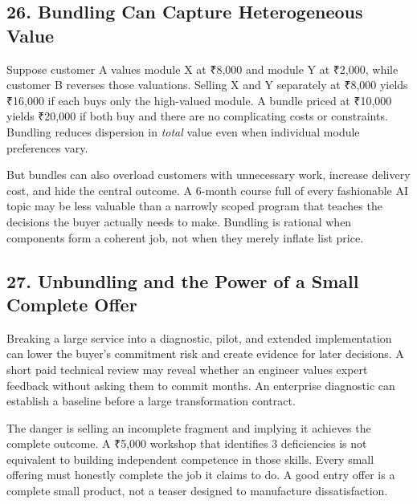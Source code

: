 \subsection*{26. Bundling Can Capture Heterogeneous Value}

Suppose customer A values module X at ₹8,000 and module Y at ₹2,000, while customer B reverses those valuations. Selling X and Y separately at ₹8,000 yields ₹16,000 if each buys only the high-valued module. A bundle priced at ₹10,000 yields ₹20,000 if both buy and there are no complicating costs or constraints. Bundling reduces dispersion in \emph{total} value even when individual module preferences vary.

But bundles can also overload customers with unnecessary work, increase delivery cost, and hide the central outcome. A 6-month course full of every fashionable AI topic may be less valuable than a narrowly scoped program that teaches the decisions the buyer actually needs to make. Bundling is rational when components form a coherent job, not when they merely inflate list price.

\subsection*{27. Unbundling and the Power of a Small Complete Offer}

Breaking a large service into a diagnostic, pilot, and extended implementation can lower the buyer's commitment risk and create evidence for later decisions. A short paid technical review may reveal whether an engineer values expert feedback without asking them to commit months. An enterprise diagnostic can establish a baseline before a large transformation contract.

The danger is selling an incomplete fragment and implying it achieves the complete outcome. A ₹5,000 workshop that identifies 3 deficiencies is not equivalent to building independent competence in those skills. Every small offering must honestly complete the job it claims to do. A good entry offer is a complete small product, not a teaser designed to manufacture dissatisfaction.
